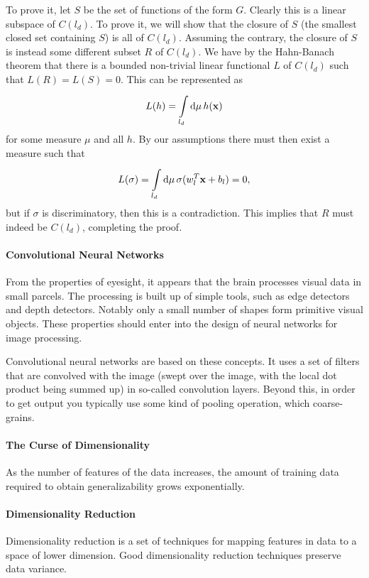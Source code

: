 To prove it, let $S$ be the set of functions of the form $G$. Clearly this is a linear subspace of $C(l_{d})$. To prove it, we will show that the closure of $S$ (the smallest closed set containing $S$) is all of $C(l_{d})$. Assuming the contrary, the closure of $S$ is instead some different subset $R$ of $C(l_{d})$. We have by the Hahn-Banach theorem that there is a bounded non-trivial linear functional $L$ of $C(l_{d})$ such that $L(R) = L(S) = 0$. This can be represented as
\begin{align*}
	L(h) = \int\limits_{l_{d}}^{}\dd{\mu}h(\vb{x})
\end{align*}
for some measure $\mu$ and all $h$. By our assumptions there must then exist a measure such that
\begin{align*}
	L(\sigma) = \int\limits_{l_{d}}^{}\dd{\mu}\sigma(w_{l}^{T}\vb{x} + b_{l}) = 0,
\end{align*}
but if $\sigma$ is discriminatory, then this is a contradiction. This implies that $R$ must indeed be $C(l_{d})$, completing the proof.

\paragraph{Convolutional Neural Networks}
From the properties of eyesight, it appears that the brain processes visual data in small parcels. The processing is built up of simple tools, such as edge detectors and depth detectors. Notably only a small number of shapes form primitive visual objects. These properties should enter into the design of neural networks for image processing.

Convolutional neural networks are based on these concepts. It uses a set of filters that are convolved with the image (swept over the image, with the local dot product being summed up) in so-called convolution layers. Beyond this, in order to get output you typically use some kind of pooling operation, which coarse-grains.

\paragraph{The Curse of Dimensionality}
As the number of features of the data increases, the amount of training data required to obtain generalizability grows exponentially.

\paragraph{Dimensionality Reduction}
Dimensionality reduction is a set of techniques for mapping features in data to a space of lower dimension. Good dimensionality reduction techniques preserve data variance.

